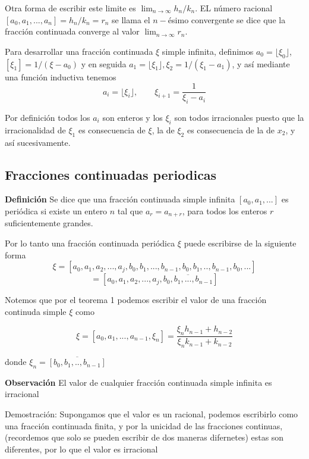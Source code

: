 \documentclass[11pt, article]{article}
\begin{document}
    Otra forma de escribir este limite es $\lim_{n\to\infty} h_n/k_n$. EL número racional $[a_0, a_1, ...,a_n]=h_n/k_n=r_n$ se llama el $n-$ésimo convergente se dice que la fracción continuada converge al valor $\lim_{n\to\infty}r_n$.
    
    Para desarrollar una fracción continuada $\xi$ simple infinita, definimos $a_0=\lfloor \xi_0 \rfloor$, $[\xi_1]=1/(\xi-a_0)$ y en seguida $a_1= \lfloor \xi_1 \rfloor, \xi_2=1/(\xi_1-a_1)$, y así mediante una función inductiva tenemos
        \begin{equation}
        a_i=\lfloor \xi_i \rfloor, \qquad \xi_{i+1}=\dfrac{1}{\xi_i-a_i}
        \label{ecuacion_1}
        \end{equation}

    Por definición todos los $a_i$ son enteros y los $\xi_i$ son todos irracionales puesto que la irracionalidad de $\xi_1$ es consecuencia de $\xi$, la de $\xi_2$ es consecuencia de la de $x_2$, y así sucesivamente.

    \subsection*{Fracciones continuadas periodicas}
    
    \textbf{Definición} Se dice que una fracción continuada simple infinita $[a_0,a_1,...]$ es periódica si existe un entero $n$ tal que $a_r=a_{n+r}$, para todos los enteros $r$ suficientemente grandes.
    
    Por lo tanto una fracción continuada periódica $\xi$ puede escribirse de la siguiente forma
        \[\xi=
        [a_0,a_1,a_2,...,a_j,b_0,b_1,...,b_{n-1},b_0,b_1,..,b_{n-1},b_{0},...]
        \]
        \[
        =[a_0,a_1,a_2,...,a_j,\overline{b_0,b_1,...,b_{n-1}}]
        \]
    
    Notemos que por el teorema 1 podemos escribir el valor de una fracción continuda simple $\xi$ como 

    \begin{equation}
    \xi=[a_0,a_1,...,a_{n-1},\xi_n]=\dfrac{\xi_n h_{n-1} + h_{n-2}}{\xi_n k_{n-1} + k_{n-2}}  \label{ecuacion_8}
    \end{equation}
    
    donde $\xi_n=\overline{[b_0,b_1,..,b_{n-1}]}$
    
    \textbf{Observación} El valor de cualquier fracción continuada simple infinita es irracional
    
    Demostración: Supongamos que el valor es un racional, podemos escribirlo como una fracción continuada finita, y por la unicidad de las fracciones continuas, (recordemos que solo se pueden escribir de dos maneras difernetes)  estas son diferentes, por lo que el valor es irracional
    
\end{document}
